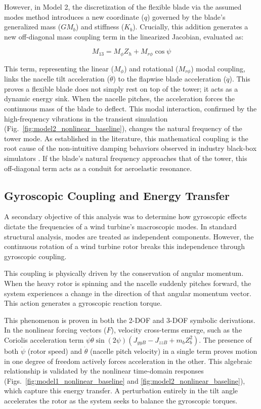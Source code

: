 \documentclass[final,onecolumn]{IEEEtran}
\begin{document}
However, in Model 2, the discretization of the flexible blade via the assumed modes method introduces a new coordinate ($q$) governed by the blade's generalized mass ($GM_b$) and stiffness ($K_b$). Crucially, this addition generates a new off-diagonal mass coupling term in the linearized Jacobian, evaluated as:

\begin{equation}
    M_{13} = M_{\phi} Z_{h} + M_{r\phi} \cos{\psi}
\end{equation}

This term, representing the linear ($M_{\phi}$) and rotational ($M_{r\phi}$) modal coupling, links the nacelle tilt acceleration ($\ddot{\theta}$) to the flapwise blade acceleration ($\ddot{q}$). This proves a flexible blade does not simply rest on top of the tower; it acts as a dynamic energy sink. When the nacelle pitches, the acceleration forces the continuous mass of the blade to deflect. This modal interaction, confirmed by the high-frequency vibrations in the transient simulation (Fig.~\ref{fig:model2_nonlinear_baseline}), changes the natural frequency of the tower mode. As established in the literature, this mathematical coupling is the root cause of the non-intuitive damping behaviors observed in industry black-box simulators \cite{hansen2003improved}. If the blade's natural frequency approaches that of the tower, this off-diagonal term acts as a conduit for aeroelastic resonance.

\subsection{Gyroscopic Coupling and Energy Transfer}
\label{sec:discussion_gyroscopic}

A secondary objective of this analysis was to determine how gyroscopic effects dictate the frequencies of a wind turbine's macroscopic modes. In standard structural analysis, modes are treated as independent components. However, the continuous rotation of a wind turbine rotor breaks this independence through gyroscopic coupling.

This coupling is physically driven by the conservation of angular momentum. When the heavy rotor is spinning and the nacelle suddenly pitches forward, the system experiences a change in the direction of that angular momentum vector. This action generates a gyroscopic reaction torque.

This phenomenon is proven in both the 2-DOF and 3-DOF symbolic derivations. In the nonlinear forcing vectors ($F$), velocity cross-terms emerge, such as the Coriolis acceleration term $\dot{\psi}\dot{\theta}\sin(2\psi)(J_{yy B} - J_{zz B} + m_b Z_b^2)$. The presence of both $\dot{\psi}$ (rotor speed) and $\dot{\theta}$ (nacelle pitch velocity) in a single  term proves motion in one degree of freedom actively forces acceleration in the other. This algebraic relationship is validated by the nonlinear time-domain responses (Figs.~\ref{fig:model1_nonlinear_baseline} and \ref{fig:model2_nonlinear_baseline}), which capture this energy transfer. A perturbation entirely in the tilt angle accelerates the rotor as the system seeks to balance the gyroscopic torques.
\end{document}
